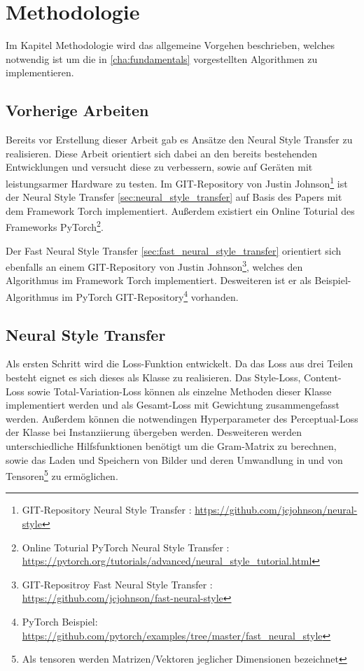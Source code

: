 \chapter{Methodologie}
\label{cha:methodology}

Im Kapitel Methodologie wird das allgemeine Vorgehen beschrieben, welches notwendig ist um die in \ref{cha:fundamentals} vorgestellten Algorithmen zu implementieren.

\section{Vorherige Arbeiten}

Bereits vor Erstellung dieser Arbeit gab es Ansätze den Neural Style Transfer zu realisieren. Diese Arbeit orientiert sich dabei an den bereits bestehenden Entwicklungen und versucht diese zu verbessern, sowie auf Geräten mit leistungsarmer Hardware zu testen. Im GIT-Repository von Justin Johnson\footnote{GIT-Repository Neural Style Transfer \cite{Johnson2015}: \url{https://github.com/jcjohnson/neural-style}} ist der  Neural Style Transfer \ref{sec:neural_style_transfer} auf Basis des Papers \cite{DBLP:journals/corr/GatysEB15a} mit dem Framework Torch \cite{torch} implementiert. Außerdem existiert ein Online Toturial des Frameworks PyTorch\footnote{Online Toturial PyTorch Neural Style Transfer \cite{OnlineToturialNeuralStylePyTorch}: \url{https://pytorch.org/tutorials/advanced/neural_style_tutorial.html}}.

Der Fast Neural Style Transfer \ref{sec:fast_neural_style_transfer} orientiert sich ebenfalls an einem GIT-Repository von Justin Johnson\footnote{GIT-Repositroy Fast Neural Style Transfer \cite{Johnson2016}: \url{https://github.com/jcjohnson/fast-neural-style}}, welches den Algorithmus im Framework Torch implementiert. Desweiteren ist er als Beispiel-Algorithmus im PyTorch GIT-Repository\footnote{PyTorch Beispiel: \url{https://github.com/pytorch/examples/tree/master/fast_neural_style}} vorhanden.

\pagebreak

\section{Neural Style Transfer}
\label{sec:method_neural_style_transfer}

Als ersten Schritt wird die Loss-Funktion entwickelt. Da das Loss aus drei Teilen besteht eignet es sich dieses als Klasse zu realisieren. Das Style-Loss, Content-Loss sowie Total-Variation-Loss können als einzelne Methoden dieser Klasse implementiert werden und als Gesamt-Loss mit Gewichtung zusammengefasst werden. Außerdem können die notwendingen Hyperparameter des Perceptual-Loss der Klasse bei Instanziierung übergeben werden. Desweiteren werden unterschiedliche Hilfsfunktionen benötigt um die Gram-Matrix zu berechnen, sowie das Laden und Speichern von Bilder und deren Umwandlung in und von Tensoren\footnote{Als \gls{tensor}en werden Matrizen/Vektoren jeglicher Dimensionen bezeichnet} zu ermöglichen.

